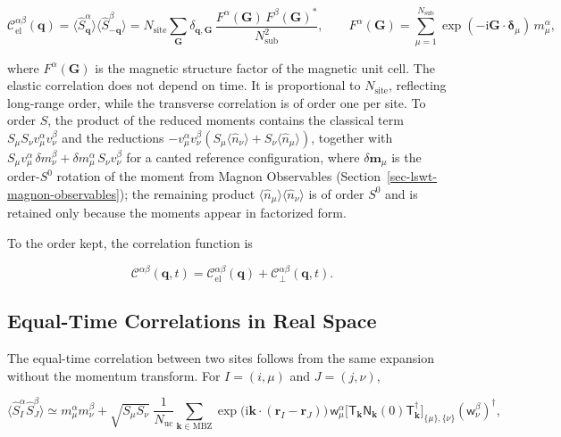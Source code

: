 \begin{equation}\label{eq-lswt-elastic-correlation}
\mathcal C_{\mathrm{el}}^{\alpha\beta}(\mathbf q)
=\big\langle\hat S_{\mathbf q}^\alpha\big\rangle\big\langle\hat S_{-\mathbf q}^\beta\big\rangle
=N_{\mathrm{site}}\sum_{\mathbf G}\delta_{\mathbf q,\mathbf G}\,
\frac{F^\alpha(\mathbf G)\,F^\beta(\mathbf G)^*}{N_{\mathrm{sub}}^2},
\qquad
F^\alpha(\mathbf G)=\sum_{\mu=1}^{N_{\mathrm{sub}}}\exp(-\mathrm i\mathbf G\cdot\boldsymbol\delta_\mu)\,m_\mu^\alpha,
\end{equation}

where \(F^\alpha(\mathbf G)\) is the magnetic structure factor of the magnetic unit cell. The elastic correlation does not depend on time. It is proportional to \(N_{\mathrm{site}}\), reflecting long-range order, while the transverse correlation is of order one per site. To order \(S\), the product of the reduced moments contains the classical term \(S_\mu S_\nu v_\mu^\alpha v_\nu^\beta\) and the reductions \(-v_\mu^\alpha v_\nu^\beta(S_\mu\langle\hat n_\nu\rangle+S_\nu\langle\hat n_\mu\rangle)\), together with \(S_\mu v_\mu^\alpha\,\delta m_\nu^\beta+\delta m_\mu^\alpha\,S_\nu v_\nu^\beta\) for a canted reference configuration, where \(\delta\mathbf m_\mu\) is the order-\(S^0\) rotation of the moment from Magnon Observables (Section~\ref{sec-lswt-magnon-observables}); the remaining product \(\langle\hat n_\mu\rangle\langle\hat n_\nu\rangle\) is of order \(S^0\) and is retained only because the moments appear in factorized form.

To the order kept, the correlation function is

\begin{equation}\label{eq-lswt-correlation-lswt-form}
\mathcal C^{\alpha\beta}(\mathbf q,t)=\mathcal C_{\mathrm{el}}^{\alpha\beta}(\mathbf q)+\mathcal C_\perp^{\alpha\beta}(\mathbf q,t).
\end{equation}

\subsection{Equal-Time Correlations in Real Space}

The equal-time correlation between two sites follows from the same expansion without the momentum transform. For \(I=(i,\mu)\) and \(J=(j,\nu)\),

\[
\big\langle\hat S_I^\alpha\hat S_J^\beta\big\rangle
\simeq m_\mu^\alpha m_\nu^\beta
+\sqrt{S_\mu S_\nu}\;\frac{1}{N_{\mathrm{uc}}}\sum_{\mathbf k\in\mathrm{MBZ}}\exp\!\big(\mathrm i\mathbf k\cdot(\mathbf r_I-\mathbf r_J)\big)
\,\mathsf w_\mu^\alpha\big[\mathsf T_{\mathbf k}\mathsf N_{\mathbf k}(0)\mathsf T_{\mathbf k}^\dagger\big]_{\{\mu\},\{\nu\}}(\mathsf w_\nu^\beta)^\dagger,
\]

